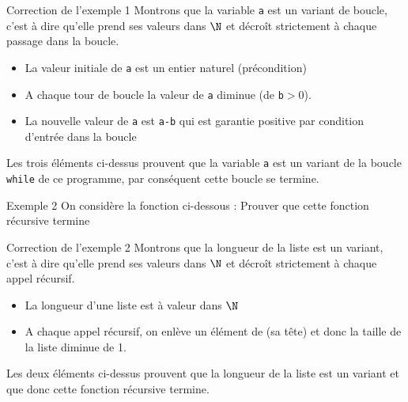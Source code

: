 \documentclass[10pt]{beamer}
\begin{document}
\begin{frame}[fragile]{\Ctitle}{\stitle}
\begin{exampleblock}{Correction de l'exemple 1}
    \textcolor{OliveGreen}{Montrons que la variable {\tt a} est un variant de boucle, c'est à dire qu'elle prend ses valeurs dans $\N$ et  décroît strictement à chaque passage dans la boucle.}
    \begin{itemize}
        \item<2->{\textcolor{OliveGreen}{La valeur initiale de \texttt{a} est un entier naturel (précondition)}}
        \item<3->{\textcolor{OliveGreen}{A chaque tour de boucle la valeur de \texttt{a} diminue (de \texttt{b}$>0$).}}
        \item<4->{\textcolor{OliveGreen}{La nouvelle valeur de \texttt{a} est \texttt{a-b} qui est garantie positive par condition d'entrée dans la boucle}}
    \end{itemize}
    \textcolor{OliveGreen}{Les trois éléments ci-dessus prouvent que la variable {\tt a} est un variant de la boucle {\tt while} de ce programme, par conséquent cette boucle se termine.}
\end{exampleblock}
\end{frame}

\begin{frame}[fragile]{\Ctitle}{\stitle}
    \begin{exampleblock}{Exemple 2}
        On considère la fonction ci-dessous :
         Prouver que cette fonction récursive termine
    \end{exampleblock}
    \end{frame}
    
    \begin{frame}[fragile]{\Ctitle}{\stitle}
    \begin{exampleblock}{Correction de l'exemple 2}
        \textcolor{OliveGreen}{Montrons que la longueur de la liste  est un variant, c'est à dire qu'elle prend ses valeurs dans $\N$ et  décroît strictement à chaque appel récursif.}
        \begin{itemize}
            \item<2->{\textcolor{OliveGreen}{La longueur d'une liste est à valeur dans $\N$}}
            \item<3->{\textcolor{OliveGreen}{A chaque appel récursif, on enlève un élément de  (sa tête) et donc la taille de la liste diminue de 1.}}
        \end{itemize}
        \textcolor{OliveGreen}{Les deux éléments ci-dessus prouvent que la longueur de la liste est un variant et que donc cette fonction récursive termine.}
    \end{exampleblock}
    \end{frame}
\end{document}
